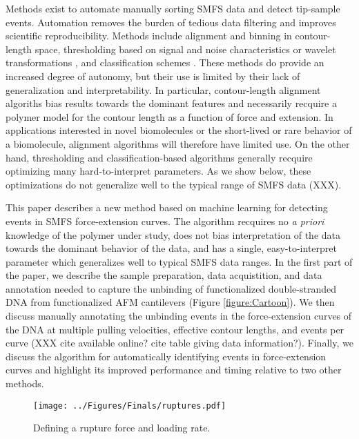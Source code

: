 \documentclass[%
  aip,12pt,tightenlines,
  amsthm,
 amsmath,amssymb
]{article}
\newcommand{\fRef}[1]{Figure \ref{figure:#1}}
\newcommand{\fLabel}[1]{\label{figure:#1}}
\newcommand{\pcaption}[1]{\caption{\noindent#1}}
\newcommand{\pl}[0]{\vspace{6pt}}
\newcommand{\singlemol}[0]{SMFS}
\begin{document}
Methods exist to automate manually sorting \singlemol{} data and detect tip-sample events. Automation removes the burden of tedious data filtering and improves scientific reproducibility. Methods include alignment and binning in contour-length space\cite{kuhn_automated_2005,bosshart_reference-free_2012}, thresholding based on signal and noise characteristics \cite{gergely_semi-automatized_2001,roduit_openfovea:_2012} or wavelet transformations \cite{garcia-masso_automated_2016,benitez_searching_2017}, and classification schemes \cite{kasas_fuzzy_2000}. These methods do provide an increased degree of autonomy, but their use is limited by their lack of generalization and interpretability. In particular, contour-length alignment algoriths bias results towards the dominant features and necessarily recquire a polymer model for the contour length as a function of force and extension. In applications interested in novel biomolecules or the short-lived or rare behavior of a biomolecule, alignment algorithms will therefore have limited use.  On the other hand, thresholding and classification-based algorithms generally recquire optimizing many hard-to-interpret parameters. As we show below, these optimizations do not generalize well to the typical range of \singlemol{} data (XXX).\pl

This paper describes a new method based on machine learning for detecting events in \singlemol{} force-extension curves.  The algorithm recquires no \emph{a priori} knowledge of the polymer under study, does not bias interpretation of the data towards the dominant behavior of the data, and has a single, easy-to-interpret parameter which generalizes well to typical \singlemol{} data ranges.  In the first part of the paper, we describe the sample preparation, data acquistition, and data annotation needed to capture the unbinding of functionalized double-stranded DNA from functionalized AFM cantilevers (\fRef{Cartoon}). We then discuss manually annotating the unbinding events in the force-extension curves of the DNA at multiple pulling velocities, effective contour lengths, and events per curve (XXX cite available online? cite table giving data information?). Finally, we discuss the algorithm for automatically identifying events in force-extension curves and highlight its improved performance and timing relative to two other methods. \pl



\begin{figure}
\centering
\texttt{[image: ../Figures/Finals/ruptures.pdf]}%
\pcaption{\noindent\fLabel{Rupture} Defining a rupture force and loading rate. }  
\end{figure}
\end{document}
